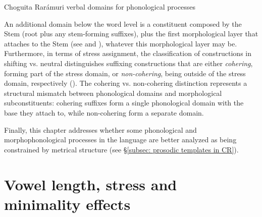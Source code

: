 \ea\label{ex: verb domains for phonological processes}
 {Choguita Rarámuri verbal domains for phonological processes}
                        \z
                	\z

An additional domain below the word level is a constituent composed by the Stem (root plus any stem-forming suffixes), plus the first morphological layer that attaches to the Stem (see  and ), whatever this morphological layer may be. Furthermore, in terms of stress assignment, the classification of constructions in shifting vs. neutral distinguishes suffixing constructions that are either \textit{cohering}, forming part of the stress domain, or \textit{non-cohering}, being outside of the stress domain, respectively (). The cohering vs. non-cohering distinction represents a structural mismatch between phonological domains and morphological subconstituents: cohering suffixes form a single phonological domain with the base they attach to, while non-cohering form a separate domain.

Finally, this chapter addresses whether some phonological and morphophonological processes in the language are better analyzed as being constrained by metrical structure (see §\ref{subsec: prosodic templates in CR}).

\section{Vowel length, stress and minimality effects}
\label{sec: vowel length, stress and minimality effects}

